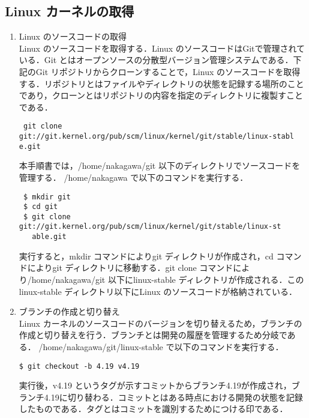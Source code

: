 \documentclass[12pt]{jsarticle}
\begin{document}
\subsection{Linux カーネルの取得}\label{sec:syutoku}
  \begin{enumerate}
  \item Linux のソースコードの取得\\    
    Linux のソースコードを取得する．Linux のソースコードはGitで管理されている．Git とはオープンソースの分散型バージョン管理システムである．下記のGit リポジトリからクローンすることで，Linux のソースコードを取得する．リポジトリとはファイルやディレクトリの状態を記録する場所のことであり，クローンとはリポジトリの内容を指定のディレクトリに複製すことである．
\begin{verbatim}
 git clone git://git.kernel.org/pub/scm/linux/kernel/git/stable/linux-stabl
e.git
\end{verbatim}
本手順書では，/home/nakagawa/git 以下のディレクトリでソースコードを管理する．
/home/nakagawa で以下のコマンドを実行する．
\begin{verbatim}
 $ mkdir git
 $ cd git
 $ git clone git://git.kernel.org/pub/scm/linux/kernel/git/stable/linux-st
   able.git
\end{verbatim}
実行すると，mkdir コマンドによりgit ディレクトリが作成され，cd コマンドによりgit ディレクトリに移動する．git clone コマンドにより/home/nakagawa/git 以下にlinux-stable ディレクトリが作成される．このlinux-stable ディレクトリ以下にLinux のソースコードが格納されている．
\item ブランチの作成と切り替え\\
  Linux カーネルのソースコードのバージョンを切り替えるため，ブランチの作成と切り替えを行う．ブランチとは開発の履歴を管理するため分岐である．
  /home/nakagawa/git/linux-stable で以下のコマンドを実行する．
\begin{verbatim}
$ git checkout -b 4.19 v4.19
\end{verbatim}
  実行後，v4.19 というタグが示すコミットからブランチ4.19が作成され，ブランチ4.19に切り替わる．コミットとはある時点における開発の状態を記録したものである．タグとはコミットを識別するためにつける印である．
  \end{enumerate}
  
\end{document}
